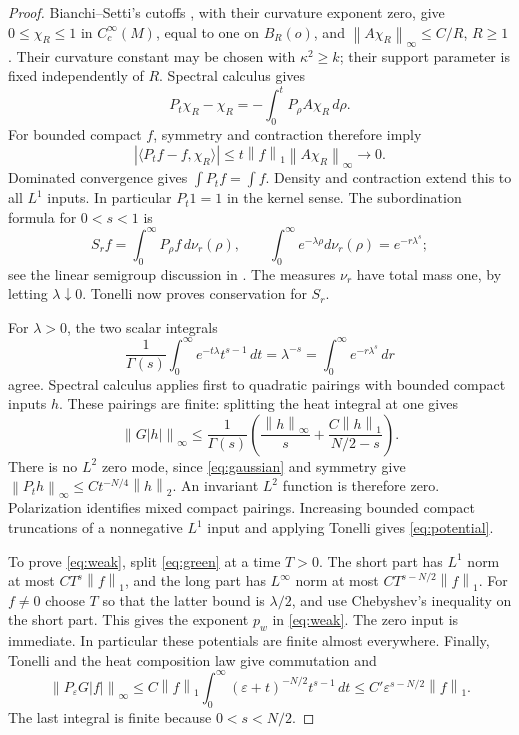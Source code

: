 \documentclass[11pt]{article}
\theoremstyle{definition}
\theoremstyle{remark}
\newcommand{\norm}[1]{\left\|#1\right\|}
\begin{document}
\begin{proof}
Bianchi--Setti's cutoffs \cite[Corollary~2.3]{BS}, with their curvature
exponent zero, give \(0\le\chi_R\le1\) in \(C_c^\infty(M)\),
equal to one on \(B_R(o)\), and
\(\norm{A\chi_R}_\infty\le C/R\), \(R\ge1\).
Their curvature constant may be chosen with \(\kappa^2\ge k\);
their support parameter is fixed independently of \(R\).
Spectral calculus gives
\[
 P_t\chi_R-\chi_R=-\int_0^tP_\rho A\chi_R\,d\rho .
\]
For bounded compact \(f\), symmetry and contraction therefore imply
\[
 |\langle P_tf-f,\chi_R\rangle|
 \le t\norm{f}_1\norm{A\chi_R}_\infty\longrightarrow0 .
\]
Dominated convergence gives \(\int P_tf=\int f\).
Density and contraction extend this to all \(L^1\) inputs.
In particular \(P_t1=1\) in the kernel sense.
The subordination formula for \(0<s<1\) is
\[
 S_rf=\int_0^\infty P_\rho f\,d\nu_r(\rho),\qquad
 \int_0^\infty e^{-\lambda\rho}d\nu_r(\rho)=e^{-r\lambda^s};
\]
see the linear semigroup discussion in
\cite[proof of Proposition~5.1]{BBGM}.
The measures \(\nu_r\) have total mass one, by letting
\(\lambda\downarrow0\). Tonelli now proves conservation for \(S_r\).

For \(\lambda>0\), the two scalar integrals
\[
 \frac1{\Gamma(s)}\int_0^\infty e^{-t\lambda}t^{s-1}\,dt
 =\lambda^{-s}=\int_0^\infty e^{-r\lambda^s}\,dr
\]
agree. Spectral calculus \cite[Section~3.1]{Teschl} applies first
to quadratic pairings with bounded compact inputs \(h\).
These pairings are finite: splitting the heat integral at one gives
\[
 \norm{G|h|}_\infty\le
 \frac1{\Gamma(s)}
 \left(\frac{\norm{h}_\infty}{s}
       +\frac{C\norm{h}_1}{N/2-s}\right).
\]
There is no \(L^2\) zero mode, since \eqref{eq:gaussian} and symmetry
give \(\norm{P_th}_\infty\le Ct^{-N/4}\norm{h}_2\).
An invariant \(L^2\) function is therefore zero.
Polarization identifies mixed compact pairings. Increasing bounded
compact truncations of a nonnegative \(L^1\) input and applying
Tonelli gives \eqref{eq:potential}.

To prove \eqref{eq:weak}, split \eqref{eq:green} at a time \(T>0\).
The short part has \(L^1\) norm at most \(CT^s\norm{f}_1\),
and the long part has \(L^\infty\) norm at most
\(CT^{s-N/2}\norm{f}_1\). For \(f\ne0\) choose \(T\) so that
the latter bound is \(\lambda/2\), and use Chebyshev's inequality
on the short part. This gives the exponent \(p_w\) in \eqref{eq:weak}.
The zero input is immediate. In particular these potentials are finite
almost everywhere.
Finally, Tonelli and the heat composition law give commutation and
\[
 \norm{P_\varepsilon G|f|}_\infty
 \le C\norm{f}_1\int_0^\infty
       (\varepsilon+t)^{-N/2}t^{s-1}\,dt
 \le C'\varepsilon^{s-N/2}\norm{f}_1 .
\]
The last integral is finite because \(0<s<N/2\).
\end{proof}
\end{document}
